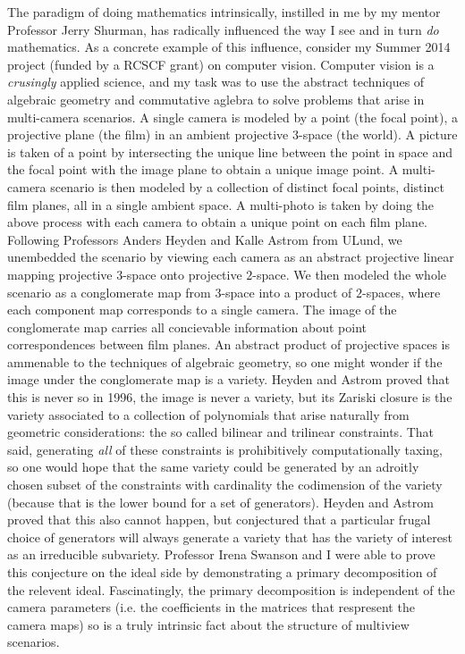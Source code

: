 \documentclass[11pt]{article} %
\theoremstyle{definition}
\begin{document}
The paradigm of doing mathematics intrinsically, instilled in me by my mentor Professor Jerry Shurman, has radically influenced the way I see and in turn \emph{do} mathematics.  As a concrete example of this influence, consider my Summer 2014 project (funded by a RCSCF grant) on computer vision. Computer vision is a \emph{crusingly} applied science, and my task was to use the abstract techniques of algebraic geometry and commutative aglebra to solve problems that arise in multi-camera scenarios. A single camera is modeled by a point (the focal point), a projective plane (the film) in an ambient  projective $3$-space (the world). A picture is taken of a point by intersecting the unique line between the point in space and the focal point with the image plane to obtain a unique image point. A multi-camera scenario is then modeled by a collection of distinct focal points, distinct film planes, all in a single ambient space. A multi-photo is taken by doing the above process with each camera to obtain a unique point on each film plane. Following Professors Anders Heyden and Kalle Astrom from ULund, we unembedded the scenario by viewing each camera as an abstract projective linear mapping projective $3$-space onto projective $2$-space. We then modeled the whole scenario as a conglomerate map from $3$-space into a product of $2$-spaces, where each component map corresponds to a single camera. The image of the conglomerate map carries all concievable information about point correspondences between film planes. An abstract product of projective spaces is ammenable to the techniques of algebraic geometry, so one might wonder if the image under the conglomerate map is a variety. Heyden and Astrom proved that this is never so in 1996, the image is never a variety, but its Zariski closure is the variety associated to a collection of polynomials that arise naturally from geometric considerations:  the so called bilinear and trilinear constraints. That said, generating \emph{all} of these constraints is prohibitively computationally taxing, so one would hope that the same variety could be generated by an adroitly chosen subset of the constraints with cardinality the codimension of the variety (because that is the lower bound for a set of generators). Heyden and Astrom proved that this also cannot happen, but conjectured that a particular frugal choice of generators will always generate a variety that has the variety of interest as an irreducible subvariety. Professor Irena Swanson and I were able to prove this conjecture on the ideal side by demonstrating a primary decomposition of the relevent ideal. Fascinatingly, the primary decomposition is independent of the camera parameters (i.e. the coefficients in the matrices that respresent the camera maps) so is a truly intrinsic fact about the structure of multiview scenarios. 
\end{document}
